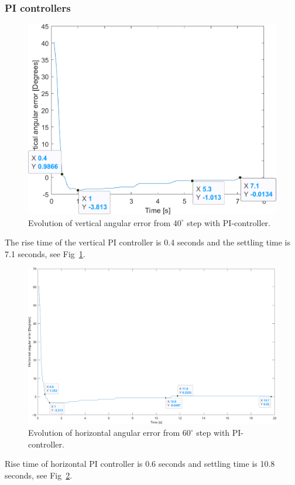 \subsubsection{PI controllers}
\label{sec:simon13}
\begin{figure}[h]
\centering
\includegraphics[width=\linewidth]{sections/assets/Vertical_PI_controller.png}
\caption{Evolution of vertical angular error from \(40^{\circ}\) step with PI-controller.}
\label{vert_PI}
\end{figure}
The rise time of the vertical PI controller is 0.4 seconds and the settling time is 7.1 seconds, see Fig~\ref{vert_PI}.
\begin{figure}[h]
\centering
\includegraphics[width=\linewidth]{sections/assets/Horizontal_PI_controller.png}
\caption{Evolution of horizontal angular error from \(60^{\circ}\) step with PI-controller.}
\label{Horizontal_PI}
\end{figure}
Rise time of horizontal PI controller is 0.6 seconds and settling time is 10.8 seconds, see Fig~\ref{Horizontal_PI}.

